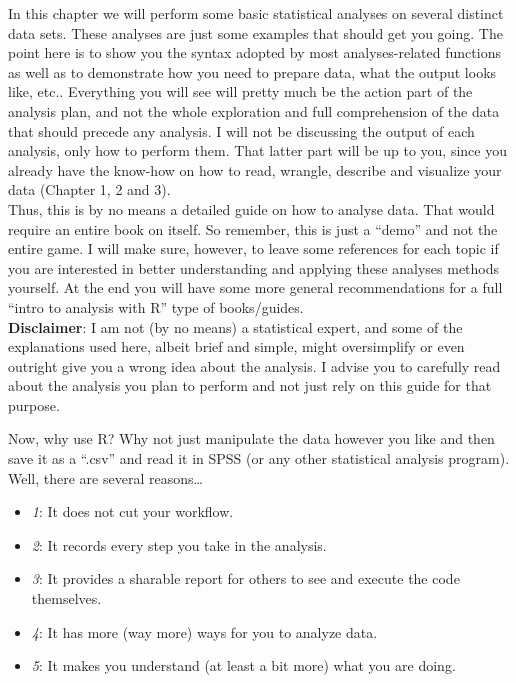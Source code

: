\documentclass[
]{book}
\begin{document}
In this chapter we will perform some basic statistical analyses on several distinct data sets. These analyses are just some examples that should get you going. The point here is to show you the syntax adopted by most analyses-related functions as well as to demonstrate how you need to prepare data, what the output looks like, etc.. Everything you will see will pretty much be the action part of the analysis plan, and not the whole exploration and full comprehension of the data that should precede any analysis. I will not be discussing the output of each analysis, only how to perform them. That latter part will be up to you, since you already have the know-how on how to read, wrangle, describe and visualize your data (Chapter 1, 2 and 3).\\
Thus, this is by no means a detailed guide on how to analyse data. That would require an entire book on itself. So remember, this is just a ``demo'' and not the entire game. I will make sure, however, to leave some references for each topic if you are interested in better understanding and applying these analyses methods yourself. At the end you will have some more general recommendations for a full ``intro to analysis with R'' type of books/guides.\\

\textbf{Disclaimer}: I am not (by no means) a statistical expert, and some of the explanations used here, albeit brief and simple, might oversimplify or even outright give you a wrong idea about the analysis. I advise you to carefully read about the analysis you plan to perform and not just rely on this guide for that purpose.

Now, why use R? Why not just manipulate the data however you like and then save it as a ``.csv'' and read it in SPSS (or any other statistical analysis program). Well, there are several reasons\ldots{}

\begin{itemize}
\item
  \emph{1}: It does not cut your workflow.\\
\item
  \emph{2}: It records every step you take in the analysis.\\
\item
  \emph{3}: It provides a sharable report for others to see and execute the code themselves.\\
\item
  \emph{4}: It has more (way more) ways for you to analyze data.\\
\item
  \emph{5}: It makes you understand (at least a bit more) what you are doing.\\
\end{itemize}
\end{document}

